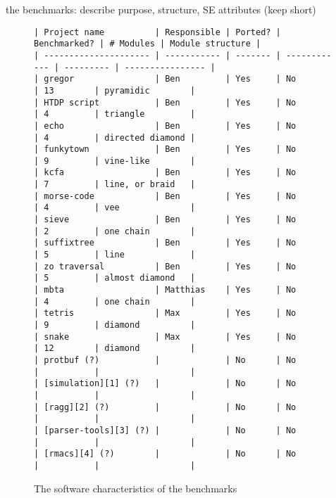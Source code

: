 
the benchmarks: describe purpose, structure, SE attributes (keep short)

\begin{figure*}
\begin{verbatim}
| Project name          | Responsible | Ported? | Benchmarked? | # Modules | Module structure |
| --------------------- | ----------- | ------- | ------------ | --------- | ---------------- |
| gregor                | Ben         | Yes     | No           | 13        | pyramidic        |
| HTDP script           | Ben         | Yes     | No           | 4         | triangle         |
| echo                  | Ben         | Yes     | No           | 4         | directed diamond |
| funkytown             | Ben         | Yes     | No           | 9         | vine-like        |
| kcfa                  | Ben         | Yes     | No           | 7         | line, or braid   |
| morse-code            | Ben         | Yes     | No           | 4         | vee              |
| sieve                 | Ben         | Yes     | No           | 2         | one chain        |
| suffixtree            | Ben         | Yes     | No           | 5         | line             |
| zo traversal          | Ben         | Yes     | No           | 5         | almost diamond   |
| mbta                  | Matthias    | Yes     | No           | 4         | one chain        |
| tetris                | Max         | Yes     | No           | 9         | diamond          |
| snake                 | Max         | Yes     | No           | 12        | diamond          |
| protbuf (?)           |             | No      | No           |           |                  |
| [simulation][1] (?)   |             | No      | No           |           |                  |
| [ragg][2] (?)         |             | No      | No           |           |                  |
| [parser-tools][3] (?) |             | No      | No           |           |                  |
| [rmacs][4] (?)        |             | No      | No           |           |                  |
\end{verbatim}
\caption{The software characteristics of the benchmarks} \label{fig:bm}
\end{figure*}
